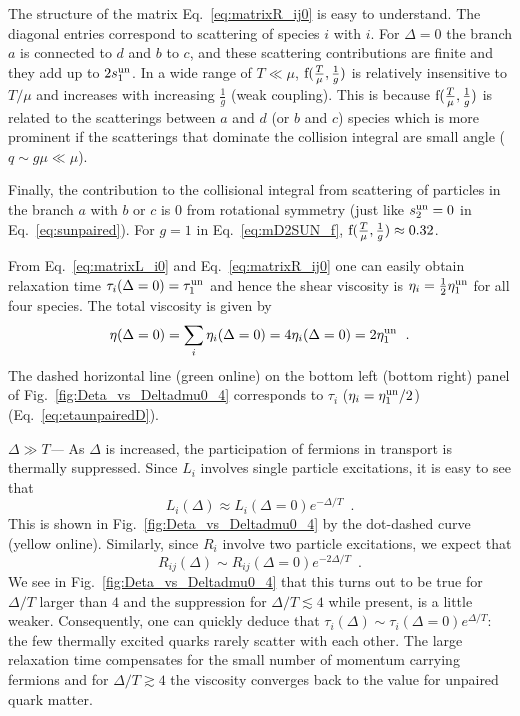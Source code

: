 \documentclass[10pt, aps, prd, superscriptaddress, nofootinbib, 
               amsmath, amssymb, twocolumn,
               preprintnumbers, showpacs,
               raggedbottom,
               floatfix]{revtex4-1}
\newcommand{\f}{{\rm{f}}}
\newcommand{\un}{{\rm{un}}}
\begin{document}
The structure of the matrix Eq.~\ref{eq:matrixR_ij0} is easy to understand. The
diagonal entries correspond to scattering of species $i$ with $i$. For
$\Delta=0$ the branch $a$ is connected to $d$ and $b$ to $c$, and these
scattering contributions are finite and they add up to $2s_1^{\un}$.  In a wide
range of $T\ll\mu$, $\f(\frac{T}{\mu},\frac{1}{g})$ is relatively
insensitive to $T/\mu$ and increases with increasing $\frac{1}{g}$ (weak coupling).
This is because $\f(\frac{T}{\mu},\frac{1}{g})$ is related to the
scatterings between $a$ and $d$ (or $b$ and $c$) species which is more
prominent if the scatterings that dominate the collision integral are small
angle ($q\sim g\mu \ll\mu$). 

Finally, the contribution to the collisional integral from scattering of
particles in the branch $a$ with $b$ or $c$ is $0$ from rotational symmetry
(just like $s_2^{\un}=0$ in Eq.~\ref{eq:sunpaired}). For $g=1$ in 
Eq.~\ref{eq:mD2SUN_f}, $\f(\frac{T}{\mu},\frac{1}{g})\approx 0.32$. 

From Eq.~\ref{eq:matrixL_i0} and Eq.~\ref{eq:matrixR_ij0} one can easily obtain
relaxation time $\tau_i(\Delta=0) = \tau_1^{\un}$ and hence the shear viscosity
is $\eta_i = \frac{1}{2}\eta_1^{\un}$ for all four species. The total viscosity
is given by
\begin{equation}
\eta(\Delta=0) = \sum_i \eta_i(\Delta=0) = 4\eta_i(\Delta=0) =
2\eta_1^{\un}~\label{eq:eta_i0_tot}\;.
\end{equation}
The dashed horizontal line (green online) on the bottom left (bottom right) 
panel of Fig.~\ref{fig:Deta_vs_Deltadmu0_4} corresponds to $\tau_i$ 
($\eta_i=\eta_1^{\un}/2$) (Eq.~\ref{eq:etaunpairedD}).

{\textit{$\Delta\gg T$---}} As $\Delta$ is increased, the participation of
fermions in transport is thermally suppressed. Since $L_i$ involves single
particle excitations, it is easy to see that 
\begin{equation}
L_i(\Delta)\approx L_i(\Delta=0)e^{-\Delta/T}~\label{eq:LDelta}\;.
\end{equation}
This is shown in Fig.~\ref{fig:Deta_vs_Deltadmu0_4} by the dot-dashed curve (yellow
online). Similarly, since $R_i$ involve two particle excitations, we expect
that 
\begin{equation}
R_{ij}(\Delta)\sim R_{ij}(\Delta=0)e^{-2\Delta/T}~\label{eq:R2Delta}\;.
\end{equation}
We see in Fig.~\ref{fig:Deta_vs_Deltadmu0_4} that this turns out to be true for
$\Delta/T$ larger than $4$ and the suppression for $\Delta/T\lesssim4$ while present,
is a little weaker. Consequently, one can quickly deduce that
$\tau_i(\Delta)\sim\tau_i(\Delta=0)e^{\Delta/T}$: the few thermally excited quarks
rarely scatter with each other. The large relaxation time compensates for the
small number of momentum carrying fermions and for $\Delta/T\gtrsim 4$ the
viscosity converges back to the value for unpaired quark matter.
\end{document}
